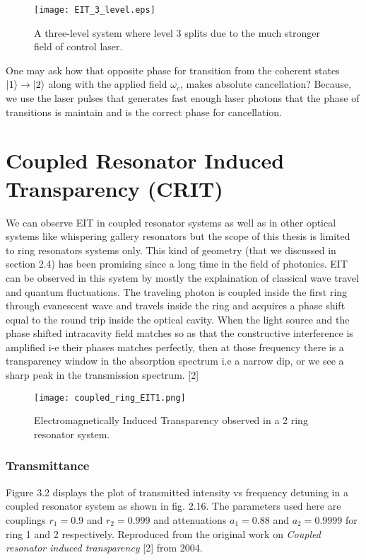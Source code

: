 \begin{figure}[h]
\centering
\texttt{[image: EIT\_3\_level.eps]}
\caption{A three-level system where level 3 splits due to the much stronger field of control laser.}
\end{figure}

One may ask how that opposite phase for transition from the coherent states $\ket{1} \to \ket{2}$ along with the applied field $\omega_{c}$, makes absolute cancellation? Because, we use the laser pulses that generates fast enough laser photons that the phase of transitions is maintain and is the correct phase for cancellation. 


\section{Coupled Resonator Induced Transparency (CRIT)}
We can observe EIT in coupled resonator systems as well as in other optical systems like whispering gallery resonators but the scope of this thesis is limited to ring resonators systems only. This kind of geometry (that we discussed in section 2.4) has been promising since a long time in the field of photonics. EIT can be observed in this system by mostly the explaination of classical wave travel and quantum fluctuations. The traveling photon is coupled inside the first ring through evanescent wave and travels inside the ring and acquires a phase shift equal to the round trip inside the optical cavity. When the light source and the phase shifted intracavity field matches so as that the constructive interference is amplified i-e their phases matches perfectly, then at those frequency there is a transparency window in the absorption spectrum i.e a narrow dip, or we see a sharp peak in the transmission spectrum. [2] 

\begin{figure}[h]
\centering
\texttt{[image: coupled\_ring\_EIT1.png]}
\caption{Electromagnetically Induced Transparency observed in a 2 ring resonator system.}
\end{figure}

\subsubsection{Transmittance}
Figure 3.2 displays the plot of transmitted intensity vs frequency detuning in a coupled resonator system as shown in fig. 2.16. The parameters used here are couplings $r_{1} = 0.9$ and $r_{2} = 0.999$ and attenuations $a_{1} = 0.88$ and $a_{2} = 0.9999$ for ring 1 and 2 respectively. Reproduced from the original work on \textit{Coupled resonator induced transparency} [2] from 2004.


